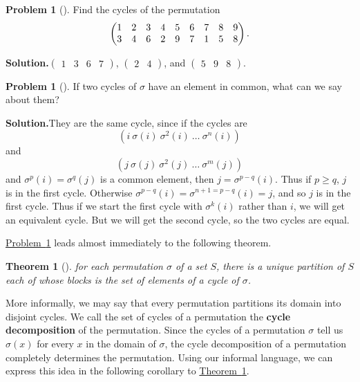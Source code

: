 \documentclass[10pt,]{book}
\newcommand{\terminology}[1]{\textbf{#1}}
\theoremstyle{plain}
\newtheorem{theorem}{Theorem}[section]
\theoremstyle{definition}
\newtheorem{activity}[project]{Problem}
\theoremstyle{definition}
\numberwithin{equation}{chapter}
\newcommand{\amp}{&}
\begin{document}
\begin{activity}[]\label{permutation-cycles}
Find the cycles of the permutation%
\begin{equation*}
\begin{pmatrix}1\amp 2\amp 3\amp 4\amp 5\amp 6\amp 7\amp 8\amp 9\cr
3\amp 4\amp 6\amp 2\amp 9\amp 7\amp 1\amp 5\amp 8
\end{pmatrix}\text{.}
\end{equation*}
%
\par\medskip\noindent%
\textbf{Solution.}\quad \(\begin{pmatrix}1\amp 3\amp 6\amp 7
\end{pmatrix}\), \(\begin{pmatrix}2\amp 4
\end{pmatrix}\), and \(\begin{pmatrix}5\amp 9\amp 8
\end{pmatrix}\).%
\end{activity}
\begin{activity}[]\label{common-elements}
If two cycles of \(\sigma\) have an element in common, what can we say about them?%
\par\medskip\noindent%
\textbf{Solution.}\quad They are the same cycle, since if the cycles are%
\begin{equation*}
(i\ \sigma(i)\ \sigma^2(i)\ \ldots\ \sigma^n(i))
\end{equation*}
and%
\begin{equation*}
(j\ \sigma(j)\ \sigma^2(j)\ \ldots\ \sigma^m(j))
\end{equation*}
and \(\sigma^p(i) = \sigma^q(j) \) is a common element, then \(j=\sigma^{p-q}(i)\).  Thus if \(p\ge q\), \(j\) is in the first cycle.  Otherwise \(\sigma^{p-q}(i) = \sigma^{n+1=p-q}(i) = j\), and so \(j\) is in the first cycle.  Thus if we start the first cycle with \(\sigma^{k}(i)\) rather than \(i\), we will get an equivalent cycle.  But we will get the second cycle, so the two cycles are equal.%
\end{activity}
\hyperref[common-elements]{Problem~\ref{common-elements}} leads almost immediately to the following theorem.%
\begin{theorem}[{}]\label{unique-partition}
for each permutation \(\sigma\) of a set \(S\), there is a unique partition of \(S\) each of whose blocks is the set of elements of a cycle of \(\sigma\).%
\end{theorem}
More informally, we may say that every permutation partitions its domain into disjoint cycles. We call the set of cycles of a permutation the \terminology{cycle decomposition} of the permutation. Since the cycles of a permutation \(\sigma\) tell us \(\sigma(x)\) for every \(x\) in the domain of \(\sigma\), the cycle decomposition of a permutation completely determines the permutation. Using our informal language, we can express this idea in the following corollary to \hyperref[unique-partition]{Theorem~\ref{unique-partition}}.%
\end{document}
